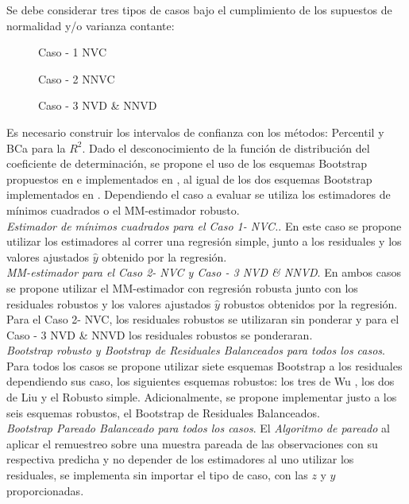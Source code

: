 Se debe considerar tres tipos de casos bajo el cumplimiento de los supuestos de normalidad y/o varianza contante:

\begin{description}
	\item[] Caso - 1 NVC
	\item[] Caso - 2 NNVC
	\item[] Caso - 3 NVD \& NNVD
\end{description}


Es necesario construir los intervalos de confianza con los métodos: Percentil y BCa para la $R^{2}$. Dado el desconocimiento de la función de distribución del coeficiente de determinación, se propone el uso de los esquemas Bootstrap propuestos en \textcite{rana-2012} e implementados en \textcite{zacarias-2023}, al igual de los dos esquemas Bootstrap implementados en \textcite{balam-2012}. Dependiendo el caso a evaluar se utiliza los estimadores de mínimos cuadrados o el MM-estimador robusto.\\


\textit{Estimador de mínimos cuadrados para el Caso 1- NVC.}. En este caso se propone utilizar los estimadores al correr una regresión simple, junto a los residuales y los valores ajustados $\hat{y}$ obtenido por la regresión.\\


\textit{MM-estimador para el Caso 2- NVC y  Caso - 3 NVD \& NNVD}. En ambos casos se propone utilizar el MM-estimador con regresión robusta junto con los residuales robustos y los valores ajustados $\hat{y}$ robustos obtenidos por la regresión. Para el Caso 2- NVC, los residuales robustos se utilizaran sin ponderar y para el  Caso - 3 NVD \& NNVD los residuales robustos se ponderaran.  \\



\textit{Bootstrap robusto y Bootstrap de Residuales Balanceados para todos los casos}. Para todos los casos se propone utilizar siete esquemas Bootstrap a los residuales dependiendo sus caso, los siguientes esquemas robustos: los tres de Wu , los dos de Liu y el Robusto simple. Adicionalmente, se propone implementar justo a los seis esquemas robustos, el Bootstrap de Residuales Balanceados. \\


\textit{Bootstrap Pareado Balanceado para todos los casos}. El \textit{Algoritmo de pareado} al aplicar el remuestreo sobre una muestra pareada de las observaciones con su respectiva predicha y no depender de los estimadores al uno utilizar los residuales, se implementa sin importar el tipo de caso, con las $z$ y $y$ proporcionadas.\\

